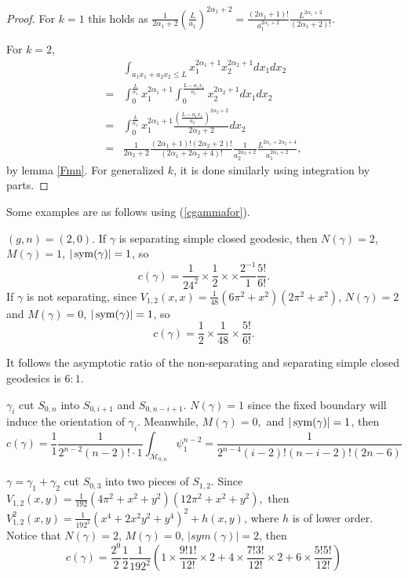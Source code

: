  \begin{proof}
 For $k=1$ this holds as $\frac{1}{2\alpha_1+2}(\frac{L}{a_1})^{2\alpha_1+2}=\frac{(2\alpha_1+1)!}{a_1^{2\alpha_1+2}} 
 \frac{L^{2\alpha_1+2}}{(2\alpha_1+2)!}.$
 
 For $k=2$,
 $$
 \begin{aligned}
  &\int_{a_1x_1+a_2x_2\leq L}x_1^{2\alpha_1+1}x_2^{2\alpha_2+1}dx_1dx_2\\
  =&\int_0^{\frac{L}{a_1}}x_1^{2\alpha_1+1}\int_{0}^{\frac{L-a_1x_1}{a_1}}x_2^{2\alpha_2+1}dx_1dx_2\\
  =&\int_0^{\frac{L}{a_1}}x_1^{2\alpha_1+1}   \frac{(\frac{L-a_1x_1}{a_2})^{2\alpha_2+2}}{2\alpha_2+2}   dx_2\\
  =&\frac{1}{2\alpha_2+2}\frac{(2\alpha_1+1)!(2\alpha_2+2)!}{(2\alpha_1+2\alpha_2+4)!}\frac{1}{a_2^{2\alpha_2+2}}\frac{L^{2\alpha_1+2\alpha_2+4}}{a_1^{2\alpha_1+2}},
 \end{aligned}
 $$
 by lemma \ref{Fmn}. For generalized $k$,  it is done similarly using  integration by parts.
 \end{proof}
 
 Some examples are as follows using (\ref{cgammafor}).
 \begin{example}
 $(g,n)=(2,0)$.
 If $\gamma$ is  separating simple closed geodesic, then $N(\gamma)=2$, $M(\gamma)=1$, $|\operatorname{sym}(\gamma)|=1$, so $$
 c(\gamma)=\frac{1}{24^2}\times \frac{1}{2}\times \times \frac{2^{-1}}{1}\frac{5!}{6!}.
 $$
 If $\gamma$ is not separating, since $V_{1,2}(x,x)=\frac{1}{48}(6\pi^2+x^2)(2\pi^2+x^2)$,  $N(\gamma)=2$ and $M(\gamma)=0$, $|\operatorname{sym}(\gamma)|=1$, so $$
 c(\gamma)=\frac{1}{2}\times \frac{1}{48}\times \frac{5!}{6!}.
 $$
 
 It follows the asymptotic  ratio of the non-separating and separating simple closed geodesics is $6:1$.
 \end{example}

\begin{example}
$\gamma_i$ cut $S_{0,n}$ into $S_{0,i+1}$ and $S_{0,n-i+1}$.
$N(\gamma)=1$ since the fixed boundary will induce the orientation of $\gamma_i$. Meanwhile, $M(\gamma)=0,$ and $|\operatorname{sym}(\gamma)|=1$,
 then $$c(\gamma)=\frac{1}{1}\frac{1}{2^{n-2}(n-2)!\cdot 1 }\int_{\overline{\mathscr{M}}_{0,n}}\psi_1^{n-2}=\frac{1}{2^{n-4}(i-2)!(n-i-2)!(2n-6)}$$
\end{example}

\begin{example}
$\gamma=\gamma_1+\gamma_2$ cut $S_{0,3}$ into two pieces of $S_{1,2}$.
Since
$V_{1,2}(x,y)=\frac{1}{192}(4\pi^2+x^2+y^2)(12\pi^2+x^2+y^2),$
then $V_{1,2}^2(x,y)=\frac{1}{192^2}(x^4+2x^2y^2+y^4)^2+h(x,y)$, where   $h$  is of lower order.
Notice that  $N(\gamma)=2$, $M(\gamma)=0$, $|sym(\gamma)|=2$, then
$$
c(\gamma)=\frac{2^0}{2}\frac{1}{2}\frac{1}{192^2}(1\times \frac{9!1!}{12!}\times 2+4\times\frac{7!3!}{12!}\times 2 +6\times \frac{5!5!}{12!})
$$
\end{example}
